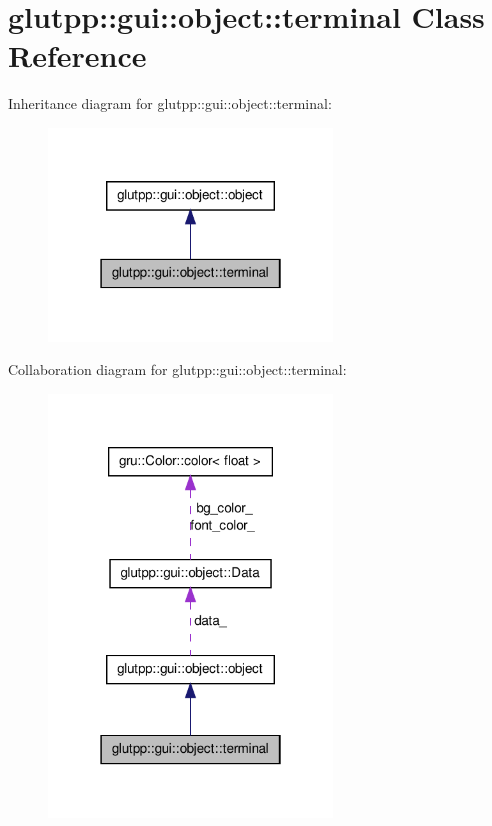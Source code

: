 \hypertarget{classglutpp_1_1gui_1_1object_1_1terminal}{\section{glutpp\-:\-:gui\-:\-:object\-:\-:terminal \-Class \-Reference}
\label{classglutpp_1_1gui_1_1object_1_1terminal}
}


\-Inheritance diagram for glutpp\-:\-:gui\-:\-:object\-:\-:terminal\-:\nopagebreak
\begin{figure}[H]
\begin{center}
\leavevmode
\includegraphics[width=214pt]{classglutpp_1_1gui_1_1object_1_1terminal__inherit__graph}
\end{center}
\end{figure}


\-Collaboration diagram for glutpp\-:\-:gui\-:\-:object\-:\-:terminal\-:\nopagebreak
\begin{figure}[H]
\begin{center}
\leavevmode
\includegraphics[width=214pt]{classglutpp_1_1gui_1_1object_1_1terminal__coll__graph}
\end{center}
\end{figure}
